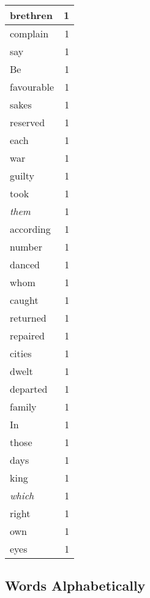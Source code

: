\begin{center}
\begin{longtable}{l|r}
brethren & 1 \\ \hline
complain & 1 \\ \hline
say & 1 \\ \hline
Be & 1 \\ \hline
favourable & 1 \\ \hline
sakes & 1 \\ \hline
reserved & 1 \\ \hline
each & 1 \\ \hline
war & 1 \\ \hline
guilty & 1 \\ \hline
took & 1 \\ \hline
\emph{them} & 1 \\ \hline
according & 1 \\ \hline
number & 1 \\ \hline
danced & 1 \\ \hline
whom & 1 \\ \hline
caught & 1 \\ \hline
returned & 1 \\ \hline
repaired & 1 \\ \hline
cities & 1 \\ \hline
dwelt & 1 \\ \hline
departed & 1 \\ \hline
family & 1 \\ \hline
In & 1 \\ \hline
those & 1 \\ \hline
days & 1 \\ \hline
king & 1 \\ \hline
\emph{which} & 1 \\ \hline
right & 1 \\ \hline
own & 1 \\ \hline
eyes & 1 \\ \hline
\end{longtable}
\end{center}



\normalsize



\subsection{Words Alphabetically}

